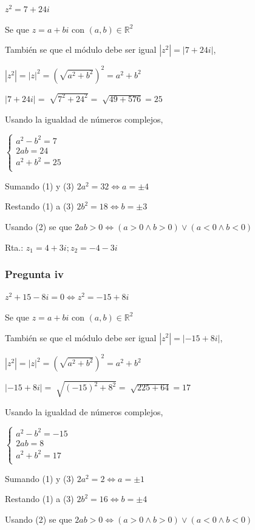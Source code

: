 $ z^2 = 7+24i $

Se que $ z = a+bi $ con $ (a,b) \in \mathbb{R}^2 $

También se que el módulo debe ser igual $ |z^2| = |7+24i| $,

$ |z^2| = |z|^2 = (\sqrt{a^2+b^2})^2 = a^2+b^2 $

$ |7+24i| = \sqrt[]{7^2+24^2} = \sqrt[]{49+576} = 25 $

Usando la igualdad de números complejos,

$ \begin{cases}
    a^2-b^2 = 7 \\
    2ab = 24 \\
    a^2+b^2 = 25 \\
\end{cases} $

Sumando (1) y (3) $ 2a^2 = 32 \iff a = \pm 4 $

Restando (1) a (3) $ 2b^2 = 18 \iff b = \pm 3 $

Usando (2) se que $ 2ab > 0 \iff (a > 0 \wedge b > 0) \vee (a < 0 \wedge b < 0) $

Rta.: $ z_1 = 4+3i; z_2 = -4-3i $

\subsubsection{Pregunta iv}

$ z^2 + 15 - 8i = 0 \iff z^2 = -15+8i $

Se que $ z = a+bi $ con $ (a,b) \in \mathbb{R}^2 $

También se que el módulo debe ser igual $ |z^2| = |-15+8i| $,

$ |z^2| = |z|^2 = (\sqrt{a^2+b^2})^2 = a^2+b^2 $

$ |-15+8i| = \sqrt[]{(-15)^2+8^2} = \sqrt[]{225 + 64} = 17 $

Usando la igualdad de números complejos,

$ \begin{cases}
    a^2-b^2 = -15 \\
    2ab = 8 \\
    a^2+b^2 = 17 \\
\end{cases} $

Sumando (1) y (3) $ 2a^2 = 2 \iff a = \pm 1 $

Restando (1) a (3) $ 2b^2 = 16 \iff b = \pm 4 $

Usando (2) se que $ 2ab > 0 \iff (a > 0 \wedge b > 0) \vee (a < 0 \wedge b < 0) $

